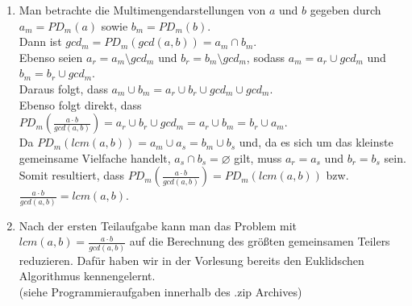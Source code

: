 \documentclass[a4paper,11pt]{article}             %
\begin{document}

\begin{enumerate}

\item Man betrachte die Multimengendarstellungen von $a$ und $b$ gegeben durch $a_m = PD_m(a)$ sowie $b_m = PD_m(b)$.\\
Dann ist $gcd_m = PD_m(gcd(a, b)) = a_m \cap b_m$.\\
Ebenso seien $a_r = a_m \setminus gcd_m$ und $b_r = b_m \setminus gcd_m$, sodass $a_m = a_r \cup gcd_m$ und $b_m = b_r \cup gcd_m$.\\
Daraus folgt, dass $a_m \cup b_m = a_r \cup b_r \cup gcd_m \cup gcd_m$.\\
Ebenso folgt direkt, dass $PD_m(\frac {a \cdot b}{gcd(a, b)}) = a_r \cup b_r \cup gcd_m = a_r \cup b_m = b_r \cup a_m$.\\
Da $PD_m(lcm(a, b)) = a_m \cup a_s = b_m \cup b_s$ und, da es sich um das kleinste gemeinsame Vielfache handelt, $a_s \cap b_s = \varnothing$ gilt, muss $a_r = a_s$ und $b_r = b_s$ sein.\\
Somit resultiert, dass $PD_m(\frac {a \cdot b}{gcd(a, b)}) = PD_m(lcm(a, b))$ bzw. $\frac {a \cdot b}{gcd(a, b)} = lcm(a, b)$.

\item Nach der ersten Teilaufgabe kann man das Problem mit $lcm(a, b) = \frac {a \cdot b}{gcd(a, b)}$ auf die Berechnung des größten gemeinsamen Teilers reduzieren. Dafür haben wir in der Vorlesung bereits den Euklidschen Algorithmus kennengelernt. \\
(siehe Programmieraufgaben innerhalb des .zip Archives)

\end{enumerate}
\end{document}
